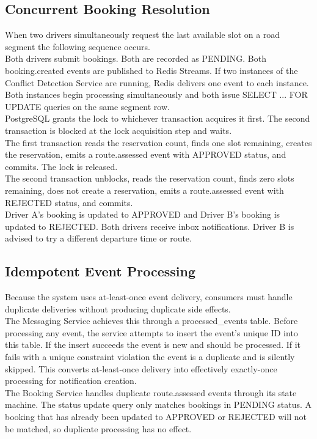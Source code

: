 \documentclass{article}
\begin{document}
\subsection{Concurrent Booking Resolution}
When two drivers simultaneously request the last available slot on a road segment the following sequence occurs.\\
Both drivers submit bookings. Both are recorded as PENDING. Both booking.created events are published to Redis Streams. If two instances of the Conflict Detection Service are running, Redis delivers one event to each instance. Both instances begin processing simultaneously and both issue SELECT ... FOR UPDATE queries on the same segment row.\\
PostgreSQL grants the lock to whichever transaction acquires it first. The second transaction is blocked at the lock acquisition step and waits. \\
The first transaction reads the reservation count, finds one slot remaining, creates the reservation, emits a route.assessed event with APPROVED status, and commits. The lock is released. \\
The second transaction unblocks, reads the reservation count, finds zero slots remaining, does not create a reservation, emits a route.assessed event with REJECTED status, and commits. \\
Driver A's booking is updated to APPROVED and Driver B's booking is updated to REJECTED. Both drivers receive inbox notifications. Driver B is advised to try a different departure time or route.

\subsection{Idempotent Event Processing}
Because the system uses at-least-once event delivery, consumers must handle duplicate deliveries without producing duplicate side effects.\\
The Messaging Service achieves this through a processed_events table. Before processing any event, the service attempts to insert the event's unique ID into this table. If the insert succeeds the event is new and should be processed. If it fails with a unique constraint violation the event is a duplicate and is silently skipped. This converts at-least-once delivery into effectively exactly-once processing for notification creation.\\
The Booking Service handles duplicate route.assessed events through its state machine. The status update query only matches bookings in PENDING status. A booking that has already been updated to APPROVED or REJECTED will not be matched, so duplicate processing has no effect.
\end{document}
